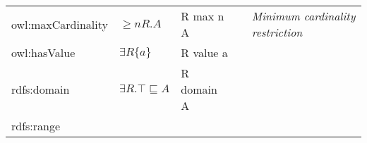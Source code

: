 \documentclass[a4paper,]{report}
\begin{document}
\begin{longtable}[]{@{}lllll@{}}
\begin{minipage}[t]{0.18\columnwidth}
owl:maxCardinality\strut
\end{minipage} & \begin{minipage}[t]{0.16\columnwidth}\raggedright
\(\geq n R.A\)\strut
\end{minipage} & \begin{minipage}[t]{0.17\columnwidth}\raggedright
R max n A\strut
\end{minipage} & \begin{minipage}[t]{0.20\columnwidth}\raggedright
\strut
\end{minipage} & \begin{minipage}[t]{0.14\columnwidth}\raggedright
\emph{Minimum cardinality restriction}\strut
\end{minipage}\tabularnewline
\begin{minipage}[t]{0.18\columnwidth}\raggedright
owl:hasValue\strut
\end{minipage} & \begin{minipage}[t]{0.16\columnwidth}\raggedright
\(\exists R\{a\}\)\strut
\end{minipage} & \begin{minipage}[t]{0.17\columnwidth}\raggedright
R value a\strut
\end{minipage} & \begin{minipage}[t]{0.20\columnwidth}\raggedright
\strut
\end{minipage} & \begin{minipage}[t]{0.14\columnwidth}\raggedright
\strut
\end{minipage}\tabularnewline
\begin{minipage}[t]{0.18\columnwidth}\raggedright
rdfs:domain\strut
\end{minipage} & \begin{minipage}[t]{0.16\columnwidth}\raggedright
\(\exists R.\top \sqsubseteq A\)\strut
\end{minipage} & \begin{minipage}[t]{0.17\columnwidth}\raggedright
R domain A\strut
\end{minipage} & \begin{minipage}[t]{0.20\columnwidth}\raggedright
\strut
\end{minipage} & \begin{minipage}[t]{0.14\columnwidth}\raggedright
\strut
\end{minipage}\tabularnewline
\begin{minipage}[t]{0.18\columnwidth}\raggedright
rdfs:range\strut
\end{minipage} & \begin{minipage}[t]{0.16\columnwidth}\raggedright

\end{minipage}
\end{longtable}
\end{document}
